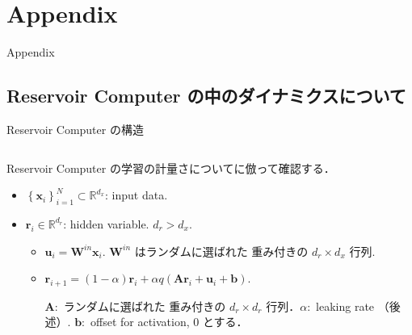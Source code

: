 \section{Appendix}

\begin{frame}
    \begin{center}
        \LARGE Appendix
    \end{center}
\end{frame}



\subsection{Reservoir Computer の中のダイナミクスについて}
\begin{frame}{Reservoir Computer の構造}
    \begin{columns}[T] %
  
        \begin{column}{.5\textwidth}
            Reservoir Computer の学習の計量さについて\cite{Bollt}に倣って確認する．
            \begin{itemize}
                \item $\left\{\mathbf{x}_i\right\}_{i=1}^N \subset \mathbb{R}^{d_x}$: input data.
                \item $\mathbf{r}_i \in \mathbb{R}^{d_r}$: hidden variable. $d_r>d_x$. \begin{itemize}
                    \item $\mathbf{u}_i=\mathbf{W}^{i n} \mathbf{x}_i$. $\mathbf{W}^{i n}$ はランダムに選ばれた 重み付きの $d_r \times d_x$ 行列. 
                    \item $\mathbf{r}_{i+1}=(1-\alpha) \mathbf{r}_i+\alpha q\left(\mathbf{A r}_i+\mathbf{u}_i+\mathbf{b}\right)$. 
                    
                    $\mathbf{A}:$ ランダムに選ばれた 重み付きの $d_r \times d_r$ 行列．$\alpha:$ leaking rate （後述）. $\mathbf{b}:$ offset for activation, $0$ とする．
                    

\end{itemize}
\end{itemize}
\end{column}
\end{columns}
\end{frame}
